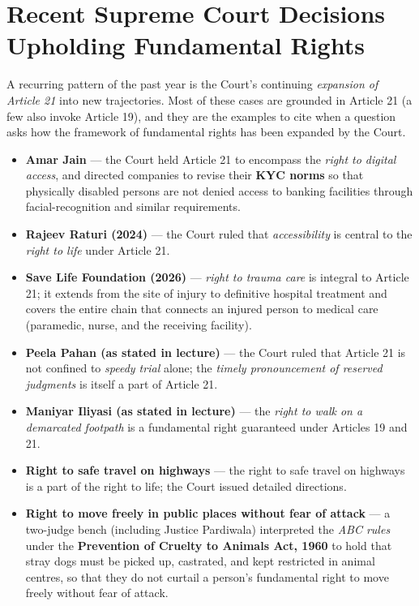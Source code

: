 \section{Recent Supreme Court Decisions Upholding Fundamental Rights}
\label{sec:recent-fundamental-rights}

A recurring pattern of the past year is the Court's continuing \emph{expansion of
Article 21} into new trajectories. Most of these cases are grounded in Article 21 (a few
also invoke Article 19), and they are the examples to cite when a question asks how the
framework of fundamental rights has been expanded by the Court.

\begin{itemize}
  \item \textbf{Amar Jain} — the Court held Article 21 to encompass the \emph{right to
        digital access}, and directed companies to revise their \textbf{KYC norms} so
        that physically disabled persons are not denied access to banking facilities
        through facial-recognition and similar requirements.
  \item \textbf{Rajeev Raturi (2024)} — the Court ruled that \emph{accessibility} is
        central to the \emph{right to life} under Article 21.
  \item \textbf{Save Life Foundation (2026)} — \emph{right to trauma care} is integral to
        Article 21; it extends from the site of injury to definitive hospital treatment
        and covers the entire chain that connects an injured person to medical care
        (paramedic, nurse, and the receiving facility).
  \item \textbf{Peela Pahan (as stated in lecture)} — the Court ruled that Article 21 is
        not confined to \emph{speedy trial} alone; the \emph{timely pronouncement of
        reserved judgments} is itself a part of Article 21.
  \item \textbf{Maniyar Iliyasi (as stated in lecture)} — the \emph{right to walk on a
        demarcated footpath} is a fundamental right guaranteed under Articles 19 and 21.
  \item \textbf{Right to safe travel on highways} — the right to safe travel on highways
        is a part of the right to life; the Court issued detailed directions.
  \item \textbf{Right to move freely in public places without fear of attack} — a
        two-judge bench (including Justice Pardiwala) interpreted the \emph{ABC rules}
        under the \textbf{Prevention of Cruelty to Animals Act, 1960} to hold that stray
        dogs must be picked up, castrated, and kept restricted in animal centres, so that
        they do not curtail a person's fundamental right to move freely without fear of
        attack.
\end{itemize}

